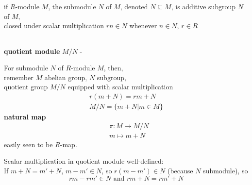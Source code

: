 \begin{definition}
	if $R$-module $M$, the submodule $N$ of $M$, denoted $N\subseteq M$, is additive subgroup $N$ of $M$, \\
	closed under scalar multiplication $rn \in N$ whenever $n\in N$, $r\in R$
\end{definition}




\begin{definition} \qquad \, \\ 
\textbf{quotient module} $M/N$  -

For submodule $N$ of $R$-module $M$, then, \\
remember $M$ abelian group, $N$ subgroup, \\
quotient group $M/N$ equipped with scalar multiplication 
\[
\begin{gathered}
	r(m+N) = rm+N \\ 
M/N = \lbrace m +N | m \in M \rbrace
\end{gathered}
\]
\textbf{natural map} 
\begin{equation}
\begin{aligned}
& \pi : M \to M /N \\ 
& m\mapsto m + N 
\end{aligned}
\end{equation}
easily seen to be $R$-map.  

Scalar multiplication in quotient module well-defined: \\
If $m+N=m'+N$, $m-m' \in N$, so $r(m-m') \in N$ (because $N$ submodule), so 
\[
rm - rm' \in N \text{ and } rm+ N = rm' +N
\]


\end{definition}


